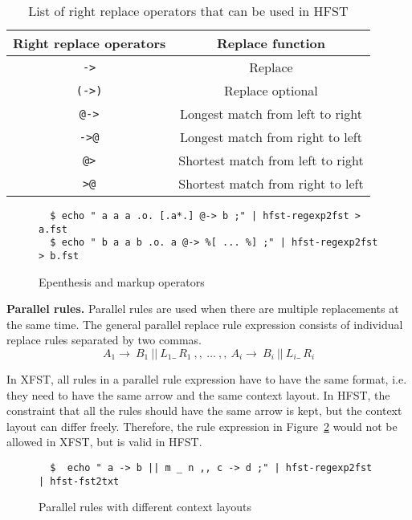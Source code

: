 \documentclass[draft]{llncs}
\begin{document}
\begin{table} [h!]
  \centering
  \caption{List of right replace operators that can be used in HFST}
  \begin{tabular}{c  c} 
    \hline
    Right replace operators & Replace function \\ \hline
    \verb!->!   & Replace \\ 
    \verb!(->)! & Replace optional \\
    \verb!@->!  & Longest match from left to right \\ 
    \verb!->@!  & Longest match from right to left \\ 
    \verb!@>!   & Shortest match from left to right \\
    \verb!>@!   & Shortest match from right to left \\  \hline
  \end{tabular}
  \label{tab:replace_operators}
\end{table}



\begin{figure} [h!]
{\footnotesize
\begin{verbatim}
  $ echo " a a a .o. [.a*.] @-> b ;" | hfst-regexp2fst > a.fst
  $ echo " b a a b .o. a @-> %[ ... %] ;" | hfst-regexp2fst > b.fst
\end{verbatim}
}
\caption{Epenthesis and markup operators}
\label{fig:epenthesis_markup}
\end{figure}



\textbf{Parallel rules.} Parallel rules are used when there are 
multiple replacements at the same time. The general parallel replace rule expression 
consists of individual replace rules separated by two commas.
\begin{equation}
  A_1 \rightarrow\ B_1\ ||\ L_1 \_\  R_1\ ,,\ \ldots\ ,,\ A_i \rightarrow\ B_i\ ||\ L_i \_\ R_i
\end{equation}

In XFST, all rules in a parallel rule expression have to have the same format, i.e. 
they need to have the same arrow and the same context layout. 
In HFST, the constraint that all the rules should have the same arrow is kept, 
but the context layout can differ freely. 
Therefore, the rule expression in Figure~\ref{fig:parallel_rules} 
would not be allowed in XFST, but is valid in HFST.
\begin{figure}
{\footnotesize
\begin{verbatim}
  $  echo " a -> b || m _ n ,, c -> d ;" | hfst-regexp2fst | hfst-fst2txt
\end{verbatim}
}
\caption{Parallel rules with different context layouts}
\label{fig:parallel_rules}
\end{figure}
\end{document}
